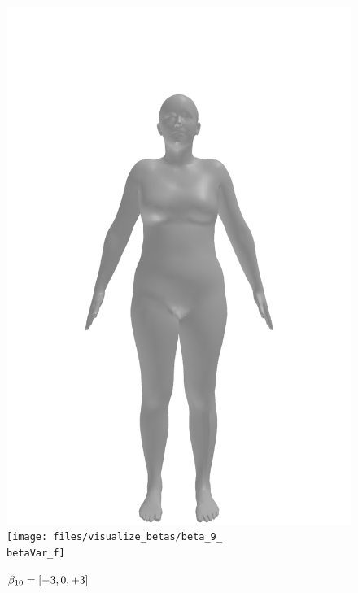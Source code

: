 \begin{figure}[ht!]
\begin{minipage}[b]{\textwidth}
        \includegraphics[width=\imgWidth]{files/visualize_betas/baseline_f}
        \texttt{[image: files/visualize\_betas/beta\_9\_\\betaVar\_f]}
        \caption[Effect of varying $\beta_{10}$ in SMPL]{$\beta_{10} = [-3, 0, +3]$}
    \end{minipage}
\end{figure}
